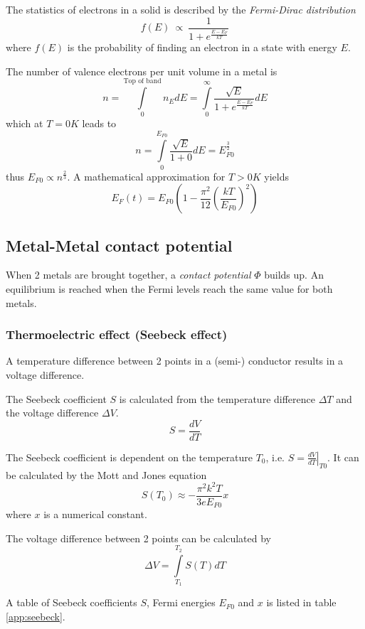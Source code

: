 The statistics of electrons in a solid is described by the \emph{Fermi-Dirac distribution}
\begin{equation}
    f(E) \:\propto\: \frac{1}{1 + e^{\frac{E-E_F}{kT}}}
\end{equation}
where $f(E)$ is the probability of finding an electron in a state with energy $E$.


The number of valence electrons per unit volume in a metal is
\begin{equation}
    n = \int\limits_{0}^{\text{Top of band}} n_E dE = \int\limits_{0}^{\infty} \frac{\sqrt{E}}{1 + e^{\frac{E-E_F}{kT}}} dE
\end{equation}
which at $T=0K$ leads to
\begin{equation}
    n = \int\limits_{0}^{E_{F0}} \frac{\sqrt{E}}{1+0} dE = E_{F0}^{\frac{3}{2}}
\end{equation}
thus $E_{F0} \propto n^{\frac{2}{3}}$.
A mathematical approximation for $T > 0K$ yields
\begin{equation}
    E_F(t) = E_{F0} \left( 1 - \frac{\pi^2}{12} \left( \frac{kT}{E_{F0}} \right)^2 \right)
\end{equation}

\subsection{Metal-Metal contact potential}
When 2 metals are brought together, a \emph{contact potential} $\Phi$ builds up.
An equilibrium is reached when the Fermi levels reach the same value for both metals.

\subsubsection{Thermoelectric effect (Seebeck effect)}
A temperature difference between 2 points in a (semi-) conductor results in a voltage difference.

The Seebeck coefficient $S$ is calculated from the temperature difference $\Delta T$ and the voltage difference $\Delta V$.
\begin{equation}
    S = \frac{dV}{dT}
\end{equation}

The Seebeck coefficient is dependent on the temperature $T_0$, i.e. $S = \left.\frac{dV}{dT}\right|_{T0}$.
It can be calculated by the Mott and Jones equation
\begin{equation}
    S(T_0) \approx -\frac{\pi^2 k^2 T}{3 e E_{F0}} x
\end{equation}
where $x$ is a numerical constant.

The voltage difference between 2 points can be calculated by
\begin{equation}
    \Delta V = \int\limits_{T_1}^{T_2} S(T) dT
\end{equation}

A table of Seebeck coefficients $S$, Fermi energies $E_{F0}$ and $x$ is listed in table \ref{app:seebeck}.


